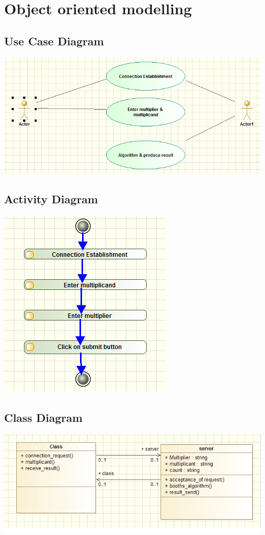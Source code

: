 \documentclass[10pt,a4paper]{article}
\begin{document}
\newpage
\section{Object oriented modelling}
\subsection{Use Case Diagram}
	\includegraphics[scale=0.8]{usecase}


\subsection{Activity Diagram}
	\includegraphics[scale=0.95]{activity}
			
\subsection{Class Diagram}
	\includegraphics[scale=0.95]{class}
\end{document}
